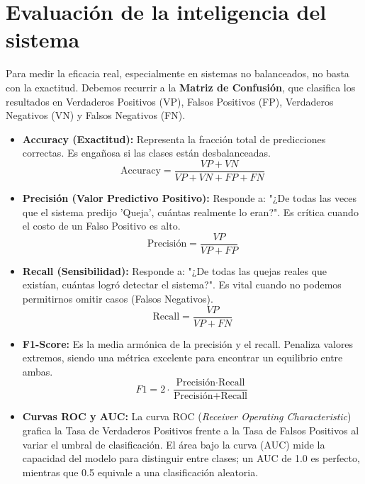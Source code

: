 \section{Evaluación de la inteligencia del sistema}
Para medir la eficacia real, especialmente en sistemas no balanceados, no basta con la exactitud. Debemos recurrir a la \textbf{Matriz de Confusión}, que clasifica los resultados en Verdaderos Positivos (VP), Falsos Positivos (FP), Verdaderos Negativos (VN) y Falsos Negativos (FN).
\begin{itemize}
\item \textbf{Accuracy (Exactitud):} Representa la fracción total de predicciones correctas. Es engañosa si las clases están desbalanceadas.
$$\text{Accuracy} = \frac{VP + VN}{VP + VN + FP + FN}$$
\item \textbf{Precisión (Valor Predictivo Positivo):} Responde a: "¿De todas las veces que el sistema predijo 'Queja', cuántas realmente lo eran?". Es crítica cuando el costo de un Falso Positivo es alto.
$$\text{Precisión} = \frac{VP}{VP + FP}$$
\item \textbf{Recall (Sensibilidad):} Responde a: "¿De todas las quejas reales que existían, cuántas logró detectar el sistema?". Es vital cuando no podemos permitirnos omitir casos (Falsos Negativos).
$$\text{Recall} = \frac{VP}{VP + FN}$$
\item \textbf{F1-Score:} Es la media armónica de la precisión y el recall. Penaliza valores extremos, siendo una métrica excelente para encontrar un equilibrio entre ambas.
$$F1 = 2 \cdot \frac{\text{Precisión} \cdot \text{Recall}}{\text{Precisión} + \text{Recall}}$$
\item \textbf{Curvas ROC y AUC:} La curva ROC (\textit{Receiver Operating Characteristic}) grafica la Tasa de Verdaderos Positivos frente a la Tasa de Falsos Positivos al variar el umbral de clasificación. El área bajo la curva (AUC) mide la capacidad del modelo para distinguir entre clases; un AUC de 1.0 es perfecto, mientras que 0.5 equivale a una clasificación aleatoria.
\end{itemize}